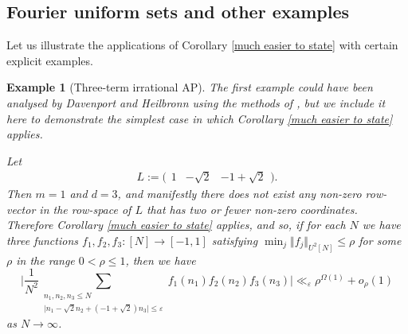 \documentclass[12pt,a4paper,twoside,reqno]{amsart}
\newtheorem{Example}[Theorem]{Example}
\numberwithin{equation}{section}
\begin{document}
\subsection{Fourier uniform sets and other examples}
Let us illustrate the applications of Corollary \ref{much easier to state} with certain explicit examples.

\begin{Example}[Three-term irrational AP]
\label{example three term irrational AP}
\emph{The first example could have been analysed by Davenport and Heilbronn using the methods of \cite{DaHe46}, but we include it here to demonstrate the simplest case in which Corollary \ref{much easier to state} applies. }

\emph{Let $$L := \Big(\begin{matrix} 1 & -\sqrt{2}  & -1 + \sqrt {2}\end{matrix}\Big).$$ Then $m=1$ and $d=3$, and manifestly there does not exist any non-zero row-vector in the row-space of $L$ that has two or fewer non-zero coordinates. Therefore Corollary \ref{much easier to state} applies, and so, if for each $N$ we have three functions $f_1,f_2,f_3:[N] \longrightarrow [-1,1]$ satisfying $\min_j \Vert f_j\Vert_{U^2[N]} \leqslant \rho$ for some $\rho$ in the range $0 < \rho \leqslant 1$, then we have
\begin{equation}
\label{three term Ap eq explicit}
\Big\vert\frac{1}{N^2}\sum\limits_{\substack{n_1,n_2,n_3\leqslant N\\ \vert n_1 - \sqrt{2}n_2 + (-1+\sqrt{2})n_3\vert\leqslant \varepsilon} }f_1(n_1)f_2(n_2)f_3(n_3)\Big\vert \ll_\varepsilon \rho^{\Omega(1)} +o_{\rho}(1)
\end{equation}}
\noindent \emph{as $N\rightarrow \infty$.} 


\end{Example}
\end{document}
